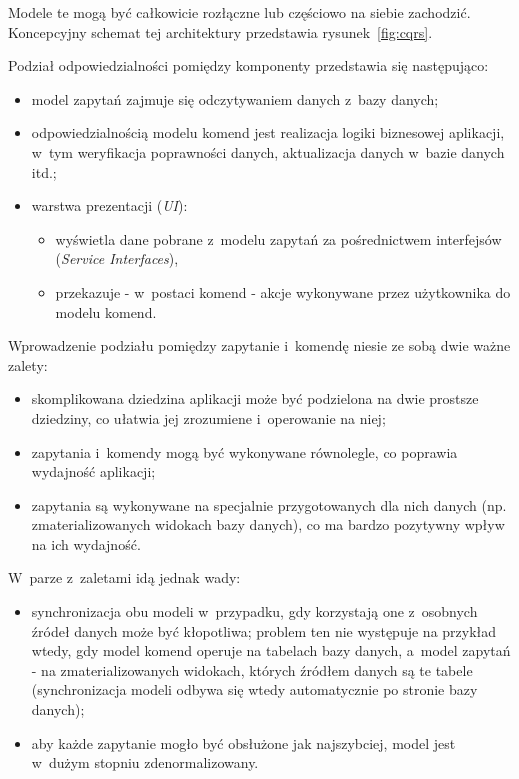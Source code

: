 Modele te mogą być całkowicie rozłączne lub częściowo na siebie zachodzić.
Koncepcyjny schemat tej architektury przedstawia rysunek~\ref{fig:cqrs}.



Podział odpowiedzialności pomiędzy komponenty przedstawia się następująco:

\begin{itemize}
 \item model zapytań zajmuje się odczytywaniem danych z~bazy danych;
 \item odpowiedzialnością modelu komend jest realizacja logiki biznesowej aplikacji, w~tym weryfikacja poprawności danych, aktualizacja danych w~bazie danych itd.;
 \item warstwa prezentacji (\emph{UI}):
  \begin{itemize}
   \item wyświetla dane pobrane z~modelu zapytań za pośrednictwem interfejsów (\emph{Service Interfaces}),
   \item przekazuje - w~postaci komend - akcje wykonywane przez użytkownika do modelu komend.
  \end{itemize}
\end{itemize}

Wprowadzenie podziału pomiędzy zapytanie i~komendę niesie ze sobą dwie ważne zalety:

\begin{itemize}
 \item skomplikowana dziedzina aplikacji może być podzielona na dwie prostsze dziedziny, co ułatwia jej zrozumiene i~operowanie na niej;
 \item zapytania i~komendy mogą być wykonywane równolegle, co poprawia wydajność aplikacji;
 \item zapytania są wykonywane na specjalnie przygotowanych dla nich danych (np. zmaterializowanych widokach bazy danych), co ma bardzo pozytywny wpływ na ich wydajność.
\end{itemize}

W~parze z~zaletami idą jednak wady:

\begin{itemize}
 \item synchronizacja obu modeli w~przypadku, gdy korzystają one z~osobnych źródeł danych może być kłopotliwa; problem ten nie występuje na przykład wtedy, gdy model komend operuje na tabelach bazy danych, a~model zapytań - na zmaterializowanych widokach, których źródłem danych są te tabele (synchronizacja modeli odbywa się wtedy automatycznie po stronie bazy danych);
 \item aby każde zapytanie mogło być obsłużone jak najszybciej, model jest w~dużym stopniu zdenormalizowany.
\end{itemize}

